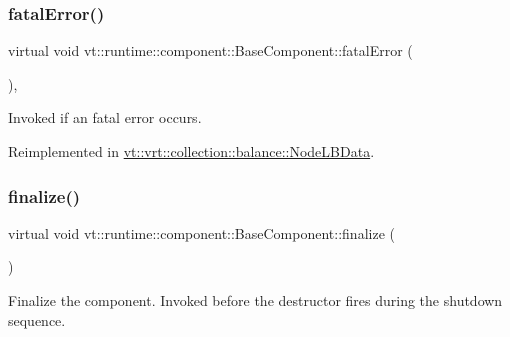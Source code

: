 \subsubsection{\texorpdfstring{fatal\+Error()}{fatalError()}}
{\footnotesize\ttfamily virtual void vt\+::runtime\+::component\+::\+Base\+Component\+::fatal\+Error (\begin{DoxyParamCaption}{ }\end{DoxyParamCaption})\hspace{0.3cm}{\ttfamily [inline]}, {\ttfamily [virtual]}}



Invoked if an fatal error occurs. 



Reimplemented in \hyperlink{structvt_1_1vrt_1_1collection_1_1balance_1_1_node_l_b_data_aefbc8058f2d74c3dd6c903e9bfefe0d2}{vt\+::vrt\+::collection\+::balance\+::\+Node\+L\+B\+Data}.

\mbox{\label{structvt_1_1runtime_1_1component_1_1_base_component_ac03e2177ad2e26b1b8cb94c7e47e3eff}} 
\subsubsection{\texorpdfstring{finalize()}{finalize()}}
{\footnotesize\ttfamily virtual void vt\+::runtime\+::component\+::\+Base\+Component\+::finalize (\begin{DoxyParamCaption}{ }\end{DoxyParamCaption})\hspace{0.3cm}{\ttfamily [pure virtual]}}



Finalize the component. Invoked before the destructor fires during the shutdown sequence. 



